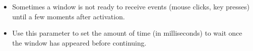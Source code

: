\begin{itemize}
\item Sometimes a window is not ready to receive events (mouse clicks, key presses) until a few moments after activation.
\item Use this parameter to set the amount of time (in milliseconds) to wait once the window has appeared before continuing.
\end{itemize}

